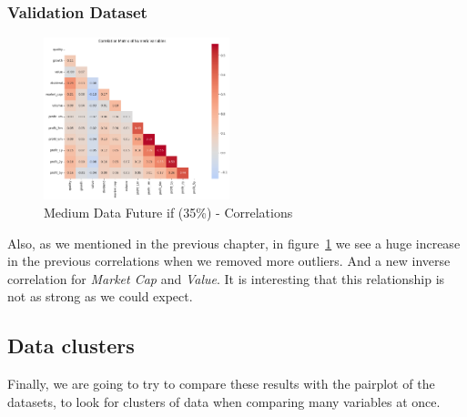 \documentclass[11pt,english,a4paper,hidelinks]{book}
\begin{document}
\subsubsection{Validation Dataset}

\begin{figure}[H]
    \centering
    \includegraphics[width=0.48\textwidth]{images/code/descriptive analysis/correlations/Medium future - IF HARD.png}
    \caption{Medium Data Future \acrshort{if} (35\%) - Correlations}
    \label{fig:medium_data_future_if_correlations}
\end{figure}


\noindent Also, as we mentioned in the previous chapter, in figure~\ref{fig:medium_data_future_if_correlations} we see a huge increase in the previous correlations when we removed more outliers. And a new inverse correlation for \textit{Market Cap} and \textit{Value}. It is interesting that this relationship is not as strong as we could expect.

\subsection{Data clusters}
Finally, we are going to try to compare these results with the \acrshort{pairplot} of the datasets, to look for clusters of data when comparing many variables at once.
\end{document}
